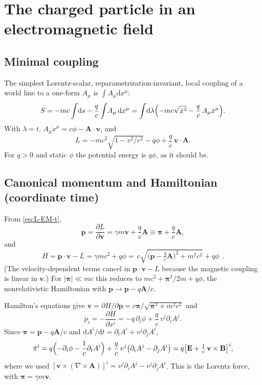 \documentclass[11pt,a4paper]{book}
\numberwithin{equation}{section}
\newcommand{\dd}{\mathrm{d}}
\newcommand{\pdv}[2]{\dfrac{\partial #1}{\partial #2}}
\newcommand{\bv}{\mathbf{v}}
\newcommand{\bp}{\mathbf{p}}
\newcommand{\bA}{\mathbf{A}}
\newcommand{\bE}{\mathbf{E}}
\newcommand{\bB}{\mathbf{B}}
\newcommand{\bpi}{\boldsymbol{\pi}}
\theoremstyle{definition}
\theoremstyle{remark}
\begin{document}
\section{The charged particle in an electromagnetic field}\label{sec:em}

\subsection{Minimal coupling}

The simplest Lorentz-scalar, reparametrization-invariant, local coupling of
a world line to a one-form $A_\mu$ is $\int A_\mu\dd x^\mu$:
\begin{equation}
  S=-mc\int\!\dd s-\frac qc\int\!A_\mu\,\dd x^\mu
   =\int\!\dd\lambda\Bigl(-mc\sqrt{\dot x^2}-\frac qc\,A_\mu\dot x^\mu\Bigr).
  \label{eq:S-EM}
\end{equation}
With $\lambda=t$, $A_\mu\dot x^\mu=c\phi-\bA\!\cdot\!\bv$, and
\begin{equation}
  L=-mc^2\sqrt{1-v^2/c^2}-q\phi+\frac qc\,\bv\!\cdot\!\bA .
  \label{eq:L-EM-t}
\end{equation}
For $q>0$ and static $\phi$ the potential energy is $q\phi$, as it should be.

\subsection{Canonical momentum and Hamiltonian (coordinate time)}

From \eqref{eq:L-EM-t},
\begin{equation}
  \bp=\pdv L\bv=\gamma m\bv+\frac qc\bA\equiv\bpi+\frac qc\bA ,
  \label{eq:p-EM}
\end{equation}
and
\begin{equation}
  H=\bp\!\cdot\!\bv-L=\gamma mc^2+q\phi
  =\boxed{\,c\sqrt{\bigl(\bp-\tfrac qc\bA\bigr)^2+m^2c^2}+q\phi\,}\ .
  \label{eq:H-EM}
\end{equation}
(The velocity-dependent terms cancel in $\bp\!\cdot\!\bv-L$ because the
magnetic coupling is linear in $\bv$.)  For $|\bpi|\ll mc$ this reduces to
$mc^2+\bpi^2/2m+q\phi$, the nonrelativistic Hamiltonian with
$\bp\to\bp-q\bA/c$.

Hamilton's equations give $\bv=\partial H/\partial\bp=c\bpi/\sqrt{\bpi^2+m^2c^2}$ and
\begin{equation}
  \dot p_i=-\pdv H{x^i}=-q\,\partial_i\phi+\frac qc\,v^j\partial_iA^j .
\end{equation}
Since $\bpi=\bp-q\bA/c$ and $\dd A^i/\dd t=\partial_tA^i+v^j\partial_jA^i$,
\begin{equation}
  \dot\pi^i=q\Bigl(-\partial_i\phi-\frac1c\partial_tA^i\Bigr)
  +\frac qc\,v^j\bigl(\partial_iA^j-\partial_jA^i\bigr)
  =q\bigl[\bE+\tfrac1c\,\bv\times\bB\bigr]^i ,
  \label{eq:Lorentz-3d}
\end{equation}
where we used $[\bv\times(\nabla\times\bA)]^i=v^j\partial_iA^j-v^j\partial_jA^i$.
This is the Lorentz force, with $\bpi=\gamma m\bv$.
\end{document}

